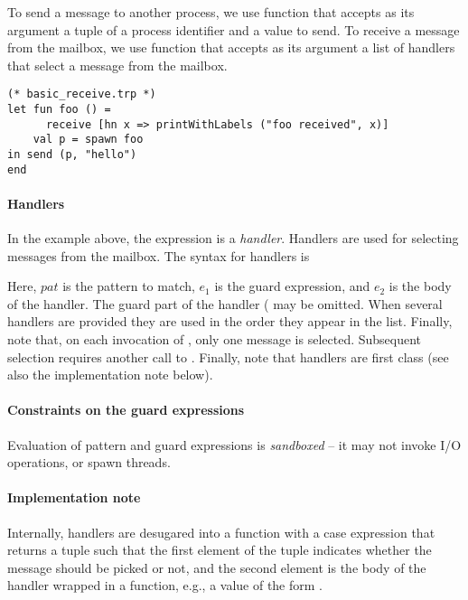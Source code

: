 To send a message to another process, we use function  that accepts as its argument a tuple of
a process identifier and a value to send. To receive a message from the mailbox, we use function 
that accepts as its argument a list of handlers that select a message from the mailbox.



\begin{lstlisting}
(* basic_receive.trp *)
let fun foo () =
      receive [hn x => printWithLabels ("foo received", x)]
    val p = spawn foo
in send (p, "hello")
end    
\end{lstlisting}


\paragraph{Handlers}\label{sec:handlers} 
In the example above, the expression  is a \emph{handler}. 
Handlers are used for selecting messages from the mailbox. The syntax for handlers is
\begin{center}
 \end{center}
 
 Here, $\mathit{pat}$ is the pattern to match, $\mathit{e_1}$ is the guard expression, and $\mathit{e_2}$ is the body of the handler. 
 The guard part of the handler ( may be omitted. 
 When several handlers are provided they are used in the order they appear in the list.
Finally, note that, on each invocation of , only one message is selected. Subsequent selection
requires another call to .
Finally, note that handlers are first class (see also the implementation note below).  

\paragraph{Constraints on the guard expressions}
Evaluation of pattern and guard expressions is \emph{sandboxed} -- it may not invoke I/O operations, or 
spawn threads.


\paragraph{Implementation note} 
Internally, handlers are desugared into a function with a case expression that returns a tuple such that the first 
element of the tuple indicates whether the message should be picked or not, and the second element is the body 
of the handler wrapped in a function, e.g., a value of the form .


